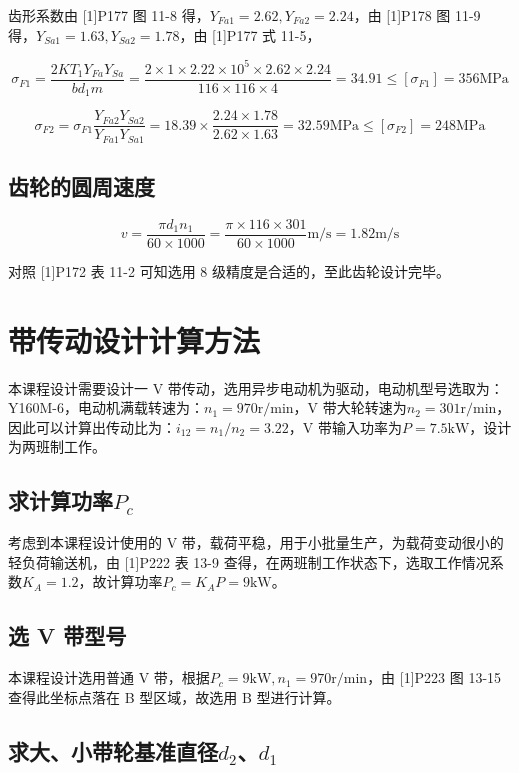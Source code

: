 \documentclass[12pt]{ctexart}
\begin{document}
齿形系数由 [1]P177 图 11-8 得，$Y_{Fa1}=2.62,Y_{Fa2}=2.24$，由 [1]P178 图 11-9 得，$Y_{Sa1}=1.63,Y_{Sa2}=1.78$，由 [1]P177 式 11-5，

$$\sigma_{F1}=\frac{2KT_1Y_{Fa}Y_{Sa}}{bd_1m}=\frac{2\times 1 \times 2.22\times 10^5\times 2.62\times 2.24}{116\times 116\times 4} = 34.91 \le [\sigma_{F1}]=356\text{MPa}$$

$$\sigma_{F2}=\sigma_{F1}\frac{Y_{Fa2}Y_{Sa2}}{Y_{Fa1}Y_{Sa1}}=18.39\times \frac{2.24\times 1.78}{2.62\times 1.63}=32.59\text{MPa}\le [\sigma_{F2}]=248\text{MPa}$$

\subsection{齿轮的圆周速度}

$$v = \frac{\pi d_1n_1}{60\times 1 000}=\frac{\pi \times 116\times 301}{60\times 1000}\text{m/s} = 1.82\text{m/s}$$

对照 [1]P172 表 11-2 可知选用 8 级精度是合适的，至此齿轮设计完毕。

\section{带传动设计计算方法}

本课程设计需要设计一 V 带传动，选用异步电动机为驱动，电动机型号选取为：Y160M-6，电动机满载转速为：$n_1 = 970\text{r/min}$，V 带大轮转速为$n_2=301\text{r/min}$，因此可以计算出传动比为：$i_{12}=n_1/n_2=3.22$，V 带输入功率为$P=7.5\text{kW}$，设计为两班制工作。

\subsection{求计算功率$P_c$}

考虑到本课程设计使用的 V 带，载荷平稳，用于小批量生产，为载荷变动很小的轻负荷输送机，由 [1]P222 表 13-9 查得，在两班制工作状态下，选取工作情况系数$K_A=1.2$，故计算功率$P_c=K_AP=9\text{kW}$。

\subsection{选 V 带型号}

本课程设计选用普通 V 带，根据$P_c=9\text{kW},n_1=970\text{r/min}$，由 [1]P223 图 13-15 查得此坐标点落在 B 型区域，故选用 B 型进行计算。

\subsection{求大、小带轮基准直径$d_2$、$d_1$}
\end{document}
